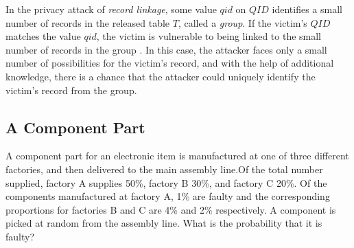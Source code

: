 In the privacy attack of \emph{record linkage}, some value $qid$ on $QID$ identifies a small number of records in the released table $T$,
called a \emph{group}. If the victim's $QID$ matches the value
$qid$, the victim is vulnerable to being linked to the small
number of records in the group \cite{madden2005taq}. In this case, the attacker faces
only a small number of possibilities for the victim's record, and
with the help of additional knowledge, there is a chance that the
attacker could uniquely identify the victim's record from the
group.





\subsection{A Component Part}
A component part for an electronic item is
manufactured at one of three different factories, and then delivered to
the main assembly line.Of the total number supplied, factory A supplies
50\%, factory B 30\%, and factory C 20\%. Of the components
manufactured at factory A, 1\% are faulty and the corresponding
proportions for factories B and C are 4\% and 2\% respectively. A
component is picked at random from the assembly line. What is the
probability that it is faulty? 



